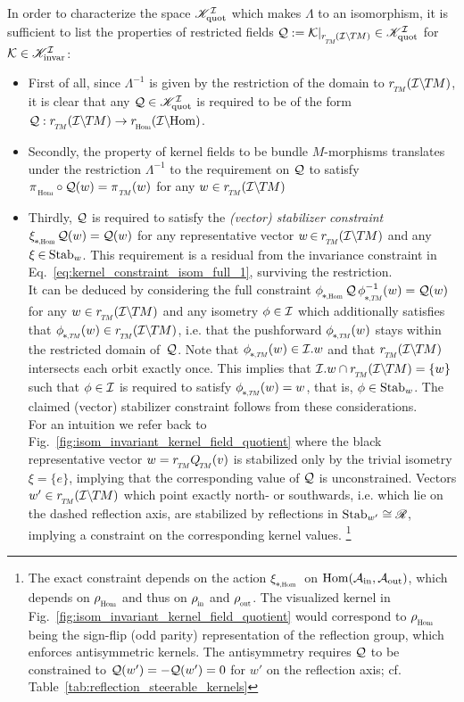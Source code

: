 In order to characterize the space $\mathscr{K}_\textup{quot}^{\mathcal{I}}$ which makes $\Lambda$ to an isomorphism, it is sufficient to list the properties of restricted fields $\Q := \Krestr \in \KIquot$ for $\mathcal{K} \in \mathscr{K}_\textup{invar}^{\mathcal{I}}$:
\begin{itemize}[leftmargin=0.6cm]

\item[{\rule[2.2pt]{2pt}{2pt}}]
First of all, since $\Lambda^{-1}$ is given by the restriction of the domain to $\rTM(\ITM)$, it is clear that any $\mathcal{Q} \in \mathscr{K}_\textup{quot}^{\mathcal{I}}$ is required to be of the form $\Q: \rTM(\ITM) \to \rHom(\IHom)$.

\item[{\rule[2.2pt]{2pt}{2pt}}]
Secondly, the property of kernel fields to be bundle $M$-morphisms translates under the restriction $\Lambda^{-1}$ to the requirement on $\mathcal{Q}$ to satisfy $\piHom\circ\Q(w) = \piTM(w)$ for any $w\in \rTM(\ITM)$

\item[{\rule[2.2pt]{2pt}{2pt}}]
Thirdly, $\mathcal{Q}$ is required to satisfy the \emph{(vector) stabilizer constraint} $\dxiHom \Q(w) = \Q(w)$ for any representative vector $w \mkern-2mu\in\mkern-1mu \rTM(\ITM)$ and any $\xi \mkern-1mu\in\mkern-1mu \operatorname{Stab}_{w}$.
This requirement is a residual from the invariance constraint in Eq.~\eqref{eq:kernel_constraint_isom_full_1}, surviving the restriction.
\\
It can be deduced by considering the full constraint $\dphiHom \Q\, \dphiTMinv(w) = \Q(w)$ for any $w \in \rTM(\ITM)$ and any isometry $\phi\in\mathcal{I}$ which additionally satisfies that $\dphiTM(w) \in \rTM(\ITM)$, i.e. that the pushforward $\dphiTM(w)$ stays within the restricted domain of~$\mathcal{Q}$.
Note that $\dphiTM(w) \in \I.w$ and that $\rTM(\ITM)$ intersects each orbit exactly once.
This implies that $\I.w \cap \rTM(\ITM) = \{w\}$ such that $\phi\in\mathcal{I}$ is required to satisfy $\dphiTM(w)=w$, that is, $\phi\in \operatorname{Stab}_{w}$.
The claimed (vector) stabilizer constraint follows from these considerations.
\\
For an intuition we refer back to Fig.~\ref{fig:isom_invariant_kernel_field_quotient} where the black representative vector $w = \rTM\QTM(v)$ is stabilized only by the trivial isometry $\xi=\{e\}$, implying that the corresponding value of $\mathcal{Q}$ is unconstrained.
Vectors $w' \in \rTM(\ITM)$ which point exactly north- or southwards, i.e. which lie on the dashed reflection axis, are stabilized by reflections in $\operatorname{Stab}_{w'}\cong\mathscr{R}$, implying a constraint on the corresponding kernel values.%
\footnote{
    The exact constraint depends on the action $\dxiHom$ on $\operatorname{Hom}(\mathcal{A}_\textup{in},\mathcal{A}_\textup{out})$, which depends on $\rhoHom$ and thus on $\rhoin$ and $\rhoout$.
    The visualized kernel in Fig.~\eqref{fig:isom_invariant_kernel_field_quotient} would correspond to $\rhoHom$ being the sign-flip (odd parity) representation of the reflection group, which enforces antisymmetric kernels.
    The antisymmetry requires $\mathcal{Q}$ to be constrained to $\mathcal{Q}(w') = -\mathcal{Q}(w') = 0$ for $w'$ on the reflection axis; cf. Table~\ref{tab:reflection_steerable_kernels}
}


\end{itemize}
